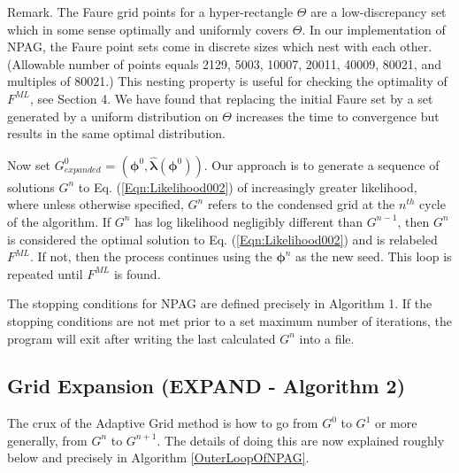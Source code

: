 Remark. The Faure grid points for a hyper-rectangle $\Theta$ are a low-discrepancy set which in some sense optimally and uniformly covers $\Theta$.  In our implementation of NPAG, the Faure point sets come in discrete sizes which nest with each other.  (Allowable number of  points equals 2129,  5003, 10007,  20011,  40009, 80021, and multiples of 80021.) This nesting property  is useful for checking the optimality of  $F^{ML}$, see Section 4. We have found that replacing the initial Faure set by a set generated by a uniform distribution on  $\Theta$
increases the time to convergence but results in the same optimal distribution. 


Now set $G^0_{expanded}$ = $(\bm{\phi}^0,\bm{\hat\lambda}(\bm{\phi}^0))$.
%
Our approach is to generate a sequence of solutions $G^n$ to Eq. (\ref{Eqn:Likelihood002}) of increasingly greater likelihood,
where unless otherwise specified, $ G^n $ refers to the condensed grid at the $n^{th}$ cycle of the algorithm.
%
%
%
If  $ G^n $ has log likelihood negligibly different than  $ G^{n-1} $, then $ G^n$  is considered the optimal solution to Eq. (\ref{Eqn:Likelihood002}) and is relabeled $F^{ML}$.
%
If not, then the process continues using the $\bm{\phi}^n$ as the new seed.
%
This loop is repeated until $F^{ML}$ is found.


The stopping conditions for NPAG are defined precisely in Algorithm 1.
If the stopping conditions are not met prior to a set maximum number of iterations, the program will exit after writing the last calculated  $G^n$ into a file.
%


\subsection{Grid Expansion (EXPAND - Algorithm 2)}
\label{SS:GridExpansion} 

The crux of the Adaptive Grid method is how to go from $G^0$ to $G^1$ or more generally, from $G^n$ to $G^{n+1}$.
%
The details of doing this are now explained roughly below and precisely in Algorithm \ref{OuterLoopOfNPAG}.

